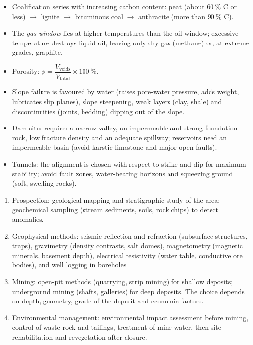 \documentclass[11pt]{article}
\newcommand{\cle}[1]{{\popxbold\color{popdark}#1}}
\begin{document}
\begin{aretenir}
\begin{itemize}
\item Coalification series with increasing carbon content: peat (about $60\ \%$ C or less) $\to$ lignite $\to$ bituminous coal $\to$ anthracite (more than $90\ \%$ C).
\item The \emph{gas window} lies at higher temperatures than the oil window; excessive temperature destroys liquid oil, leaving only dry gas (methane) or, at extreme grades, graphite.
\item Porosity: $\phi = \dfrac{V_{\text{voids}}}{V_{\text{total}}}\times 100\ \%$.
\item Slope failure is favoured by water (raises pore-water pressure, adds weight, lubricates slip planes), slope steepening, weak layers (clay, shale) and discontinuities (joints, bedding) dipping out of the slope.
\item Dam sites require: a narrow valley, an impermeable and strong foundation rock, low fracture density and an adequate spillway; reservoirs need an impermeable basin (avoid karstic limestone and major open faults).
\item Tunnels: the alignment is chosen with respect to strike and dip for maximum stability; avoid fault zones, water-bearing horizons and squeezing ground (soft, swelling rocks).
\end{itemize}
\end{aretenir}

\begin{methode}
\begin{enumerate}
\item \cle{Prospection}: geological mapping and stratigraphic study of the area; geochemical sampling (stream sediments, soils, rock chips) to detect anomalies.
\item \cle{Geophysical methods}: seismic reflection and refraction (subsurface structures, traps), gravimetry (density contrasts, salt domes), magnetometry (magnetic minerals, basement depth), electrical resistivity (water table, conductive ore bodies), and well logging in boreholes.
\item \cle{Mining}: open-pit methods (quarrying, strip mining) for shallow deposits; underground mining (shafts, galleries) for deep deposits. The choice depends on depth, geometry, grade of the deposit and economic factors.
\item \cle{Environmental management}: environmental impact assessment before mining, control of waste rock and tailings, treatment of mine water, then site rehabilitation and revegetation after closure.
\end{enumerate}
\end{methode}
\end{document}

